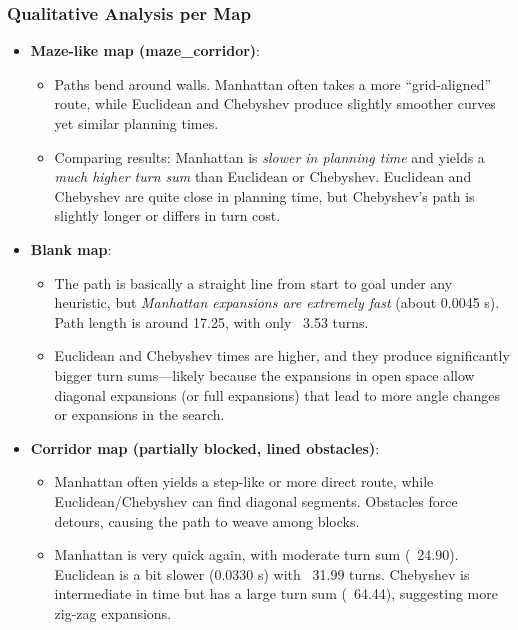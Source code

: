 \documentclass[letterpaper, 10 pt, conference]{ieeeconf}
\begin{document}
\subsubsection{Qualitative Analysis per Map}
\begin{itemize}
    \item \textbf{Maze-like map (maze\_corridor)}:
    \begin{itemize}
        \item Paths bend around walls. Manhattan often takes a more “grid-aligned” route, while Euclidean and Chebyshev produce slightly smoother curves yet similar planning times.
        \item Comparing results: Manhattan is \emph{slower in planning time} and yields a \emph{much higher turn sum} than Euclidean or Chebyshev. Euclidean and Chebyshev are quite close in planning time, but Chebyshev’s path is slightly longer or differs in turn cost.
    \end{itemize}

    \item \textbf{Blank map}:
    \begin{itemize}
        \item The path is basically a straight line from start to goal under any heuristic, but \emph{Manhattan expansions are extremely fast} (about 0.0045 s). Path length is around 17.25, with only ~3.53 turns.
        \item Euclidean and Chebyshev times are higher, and they produce significantly bigger turn sums—likely because the expansions in open space allow diagonal expansions (or full expansions) that lead to more angle changes or expansions in the search.
    \end{itemize}

    \item \textbf{Corridor map (partially blocked, lined obstacles)}:
    \begin{itemize}
        \item Manhattan often yields a step-like or more direct route, while Euclidean/Chebyshev can find diagonal segments. Obstacles force detours, causing the path to weave among blocks.
        \item Manhattan is very quick again, with moderate turn sum (~24.90). Euclidean is a bit slower (0.0330 s) with ~31.99 turns. Chebyshev is intermediate in time but has a large turn sum (~64.44), suggesting more zig-zag expansions.
    \end{itemize}
\end{itemize}
\end{document}
